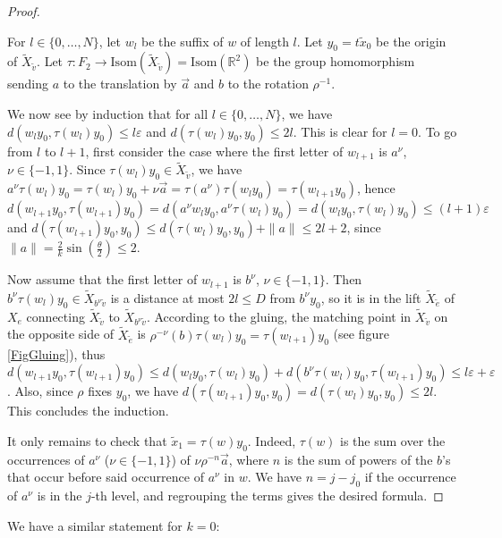 \documentclass  [a4paper, 11pts] {article}
\newcommand{\R}{\mathbb{R}}
\newcommand{\eps}{\varepsilon}
\begin{document}
\begin{proof} ~

For $l\in \{0, \ldots, N\}$, let $w_l$ be the suffix of $w$ of length $l$. Let $y_0 = t\tilde{x}_0$ be the origin of $\tilde{X}_{\tilde{v}}$. Let $\tau: F_2\longrightarrow \mathrm{Isom}(\tilde{X}_{\tilde{v}}) = \mathrm{Isom}(\R^2)$ be the group homomorphism sending $a$ to the translation by $\vec{a}$ and $b$ to the rotation $\rho^{-1}$.

We now see by induction that for all $l\in \{0, \ldots, N\}$, we have $d(w_ly_0, \tau(w_l)y_0) \le l\eps$ and $d(\tau(w_l)y_0, y_0) \le 2l$. This is clear for $l=0$. To go from $l$ to $l+1$, first consider the case where the first letter of $w_{l+1}$ is $a^\nu$, $\nu\in \{-1, 1\}$. Since $\tau(w_l)y_0\in \tilde{X}_{\tilde{v}}$, we have $a^\nu\tau(w_l)y_0 = \tau(w_l)y_0 + \nu \vec{a} = \tau(a^\nu)\tau(w_ly_0) = \tau(w_{l+1}y_0)$, hence $d(w_{l+1}y_0, \tau(w_{l+1})y_0) = d(a^\nu w_ly_0, a^\nu \tau(w_l)y_0) = d(w_ly_0, \tau(w_l)y_0) \le (l+1)\eps$ and $d(\tau(w_{l+1})y_0, y_0) \le d(\tau(w_l)y_0, y_0) + \|a\| \le 2l+2$, since $\|a\| = \frac{2}{k}\sin(\frac{\theta}{2}) \le 2$.

Now assume that the first letter of $w_{l+1}$ is $b^\nu$, $\nu\in\{-1, 1\}$. Then $b^\nu \tau(w_l)y_0\in \tilde{X}_{b^\nu\tilde{v}}$ is a distance at most $2l \le D$ from $b^\nu y_0$, so it is in the lift $\tilde{X}_{\tilde{e}}$ of $X_e$ connecting $\tilde{X}_{\tilde{v}}$ to $\tilde{X}_{b^\nu\tilde{v}}$. According to the gluing, the matching point in $\tilde{X}_{\tilde{v}}$ on the opposite side of $\tilde{X}_{\tilde{e}}$ is $\rho^{-\nu}(b)\tau(w_l)y_0 = \tau(w_{l+1})y_0$ (see figure \ref{FigGluing}), thus $d(w_{l+1}y_0, \tau(w_{l+1})y_0) \le d(w_ly_0, \tau(w_l)y_0) + d(b^\nu\tau(w_l)y_0, \tau(w_{l+1})y_0) \le l\eps + \eps$. Also, since $\rho$ fixes $y_0$, we have $d(\tau(w_{l+1})y_0, y_0) = d(\tau(w_l)y_0, y_0) \le 2l$. This concludes the induction.

It only remains to check that $\tilde{x}_1 = \tau(w)y_0$. Indeed, $\tau(w)$ is the sum over the occurrences of $a^\nu$ ($\nu\in \{-1, 1\}$) of $\nu \rho^{-n}\vec{a}$, where $n$ is the sum of powers of the $b$'s that occur before said occurrence of $a^\nu$ in $w$. We have $n = j-j_0$ if the occurrence of $a^\nu$ is in the $j$-th level, and regrouping the terms gives the desired formula.

\end{proof}

We have a similar statement for $k=0$:
\end{document}

